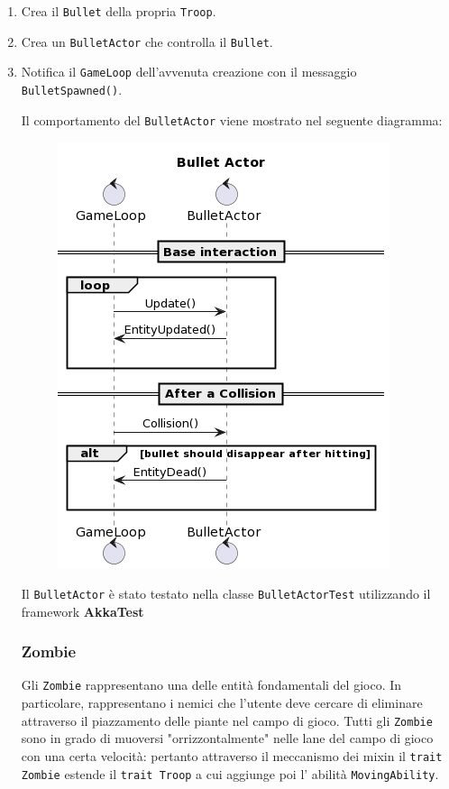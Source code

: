\begin{enumerate}
    \item Crea il \texttt{Bullet} della propria \texttt{Troop}.
    \item Crea un \texttt{BulletActor} che controlla il \texttt{Bullet}.
    \item Notifica il \texttt{GameLoop} dell'avvenuta creazione con il messaggio \texttt{BulletSpawned()}.

    Il comportamento del \texttt{BulletActor} viene mostrato nel seguente diagramma:
    \begin{figure}[H]
        \centering
        \includegraphics[width=\linewidth]{images/bullet-actor.png}
        \label{Diagramma di sequenza del Troop Actor.}
    \end{figure}

    Il \texttt{BulletActor} è stato testato nella classe \texttt{BulletActorTest} utilizzando il framework \textbf{AkkaTest}

    \subsubsection{Zombie}
    Gli \texttt{Zombie} rappresentano una delle entità fondamentali del gioco. In particolare, rappresentano i nemici che l'utente
    deve cercare di eliminare attraverso il piazzamento delle piante nel campo di gioco.
    Tutti gli \texttt{Zombie} sono in grado di muoversi "orrizzontalmente" nelle lane del campo di gioco con una certa velocità: pertanto
    attraverso il meccanismo dei mixin il \texttt{trait Zombie} estende il \texttt{trait Troop} a cui aggiunge poi l' abilità \texttt{MovingAbility}.


\end{enumerate}
